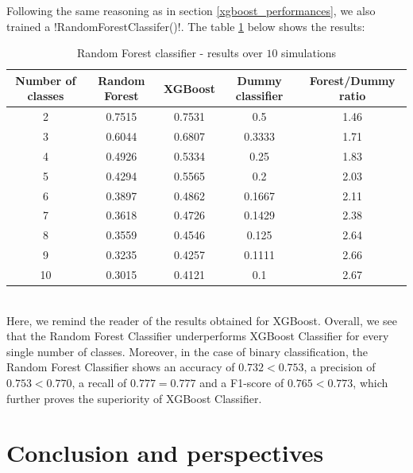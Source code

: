 \documentclass[]{article}
\begin{document}
\noindent
Following the same reasoning as in section \ref{xgboost_performances}, we also trained a \pyth!RandomForestClassifer()!. The table \ref{results_randomForestClassifier} below shows the results:
\begin{table}[!h]
	\centering
	\begin{tabular}{|c|c|c|c|c|}
		\hline
		
		\textbf{Number of classes} & \textbf{Random Forest} & \textbf{XGBoost} & \textbf{Dummy classifier} & \textbf{Forest/Dummy ratio}\\
		\hline
		2 & 0.7515 & 0.7531 & 0.5 & 1.46\\
		\hline 
		3 & 0.6044 & 0.6807 & 0.3333 & 1.71\\
		\hline 
		4 & 0.4926 & 0.5334 & 0.25 &  1.83\\
		\hline 
		5 & 0.4294 & 0.5565 & 0.2 &  2.03\\
		\hline 
		6 & 0.3897 & 0.4862 & 0.1667 & 2.11\\
		\hline 
		7 & 0.3618 & 0.4726 & 0.1429 & 2.38\\
		\hline 
		8 & 0.3559 & 0.4546 & 0.125 & 2.64\\
		\hline 
		9 & 0.3235 & 0.4257 & 0.1111 &  2.66\\
		\hline 
		10 & 0.3015 & 0.4121 & 0.1 &  2.67\\
		\hline 
	\end{tabular}
	\caption{Random Forest classifier - results over $10$ simulations}
	\label{results_randomForestClassifier}
\end{table}\\
Here, we remind the reader of the results obtained for XGBoost. Overall, we see that the Random Forest Classifier underperforms XGBoost Classifier for every single number of classes. Moreover, in the case of binary classification, the Random Forest Classifier shows an accuracy of $0.732<0.753$, a precision of $0.753<0.770$, a recall of $0.777=0.777$ and a F1-score of $0.765<0.773$, which further proves the superiority of XGBoost Classifier.





\section{Conclusion and perspectives}

\cleardoublepage
\appendix
\end{document}
